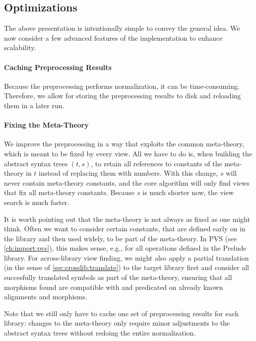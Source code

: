 \subsection{Optimizations}\label{sec:algparams}

The above presentation is intentionally simple to convey the general idea.
We now consider a few advanced features of the implementation to enhance scalability.

\paragraph{Caching Preprocessing Results}
Because the preprocessing performs normalization, it can be time-consuming.
Therefore, we allow for storing the preprocessing results to disk and reloading them in a later run.

\paragraph{Fixing the Meta-Theory}
We improve the preprocessing in a way that exploits the common meta-theory, which is meant to be fixed by every view.
All we have to do is, when building the abstract syntax trees $(t,s)$, to retain all references to constants of the meta-theory in $t$ instead of replacing them with numbers.
With this change, $s$ will never contain meta-theory constants, and the core algorithm will only find views that fix all meta-theory constants.
Because $s$ is much shorter now, the view search is much faster.

It is worth pointing out that the meta-theory is not always as fixed as one might think.
Often we want to consider certain constants, that are defined early on in the library and then used widely, to be part of the meta-theory.
In PVS (see \autoref{ch:import:pvs}), this makes sense, e.g., for all operations defined in the Prelude library. For across-library view finding, we might also apply a partial translation (in the sense of \autoref{sec:crosslib:translate}) to the target library first and consider all succesfully translated symbols as part of the meta-theory, ensuring that all morphisms found are compatible with and predicated on already known alignments and morphisms.

Note that we still only have to cache one set of preprocessing results for each library: changes to the meta-theory only require minor adjustments to the abstract syntax trees without redoing the entire normalization.

